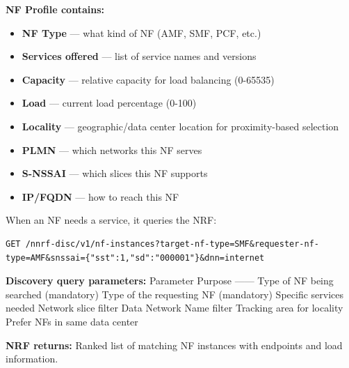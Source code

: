 \textbf{NF Profile contains:}

\begin{itemize}
\tightlist
\item
  \textbf{NF Type} — what kind of NF (AMF, SMF, PCF, etc.)
\item
  \textbf{Services offered} — list of service names and versions
\item
  \textbf{Capacity} — relative capacity for load balancing (0-65535)
\item
  \textbf{Load} — current load percentage (0-100)
\item
  \textbf{Locality} — geographic/\allowbreak{}data center location for proximity-based selection
\item
  \textbf{PLMN} — which networks this NF serves
\item
  \textbf{S-NSSAI} — which slices this NF supports
\item
  \textbf{IP/\allowbreak{}FQDN} — how to reach this NF
\end{itemize}


When an NF needs a service, it queries the NRF:

\def\CNcodelang{}

\begin{CNplaincode}
\begin{Verbatim}
GET /nnrf-disc/v1/nf-instances?target-nf-type=SMF&requester-nf-type=AMF&snssai={"sst":1,"sd":"000001"}&dnn=internet
\end{Verbatim}
\end{CNplaincode}

\textbf{Discovery query parameters:}\CNbr{}\textbar{} Parameter \textbar{} Purpose \textbar{}\CNbr{}\textbar{}—\textbar{}—\textbar{}\CNbr{}\textbar{}  \textbar{} Type of NF being searched (mandatory) \textbar{}\CNbr{}\textbar{}  \textbar{} Type of the requesting NF (mandatory) \textbar{}\CNbr{}\textbar{}  \textbar{} Specific services needed \textbar{}\CNbr{}\textbar{}  \textbar{} Network slice filter \textbar{}\CNbr{}\textbar{}  \textbar{} Data Network Name filter \textbar{}\CNbr{}\textbar{}  \textbar{} Tracking area for locality \textbar{}\CNbr{}\textbar{}  \textbar{} Prefer NFs in same data center \textbar{}

\textbf{NRF returns:} Ranked list of matching NF instances with endpoints and load information.

